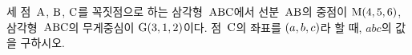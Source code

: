 세 점~$\mathrm{A}$, $\mathrm{B}$, $\mathrm{C}$를 꼭짓점으로 하는 삼각형~$\mathrm{ABC}$에서 선분~$\mathrm{AB}$의 중점이 $\mathrm{M}(4{,}\mkern3mu\mathopen{}5{,}\mkern3mu\mathopen{}6)$, 삼각형~$\mathrm{ABC}$의 무게중심이 $\mathrm{G}(3{,}\mkern3mu\mathopen{}1{,}\mkern3mu\mathopen{}2)$이다. 점~$\mathrm{C}$의 좌표를 $(a{,}\mkern3mu\mathopen{}b{,}\mkern3mu\mathopen{}c)$라 할 때, $abc$의 값을 구하시오.
